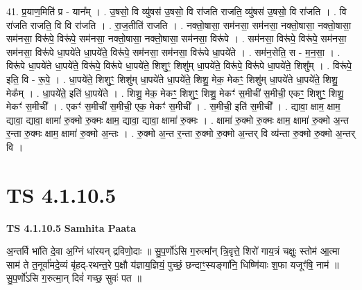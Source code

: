 \documentclass[17pt]{extarticle}
\begin{document}
41. प्र॒याण॒मिति॑ प्र - यान᳚म् । . उ॒षसो॒ वि व्यु॑षस॑ उ॒षसो॒ वि रा॑जति राजति॒ व्यु॑षस॑ उ॒षसो॒ वि रा॑जति । . वि रा॑जति राजति॒ वि वि रा॑जति । . रा॒ज॒तीति॑ राजति । . नक्तो॒षासा॒ सम॑नसा॒ सम॑नसा॒ नक्तो॒षासा॒ नक्तो॒षासा॒ सम॑नसा॒ विरू॑पे॒ विरू॑पे॒ सम॑नसा॒ नक्तो॒षासा॒ नक्तो॒षासा॒ सम॑नसा॒ विरू॑पे । . सम॑नसा॒ विरू॑पे॒ विरू॑पे॒ सम॑नसा॒ सम॑नसा॒ विरू॑पे धा॒पये॑ते धा॒पये॑ते॒ विरू॑पे॒ सम॑नसा॒ सम॑नसा॒ विरू॑पे धा॒पये॑ते । . सम॑न॒सेति॒ स - म॒न॒सा॒ । . विरू॑पे धा॒पये॑ते धा॒पये॑ते॒ विरू॑पे॒ विरू॑पे धा॒पये॑ते॒ शिशुꣳ॒॒ शिशु॑म् धा॒पये॑ते॒ विरू॑पे॒ विरू॑पे धा॒पये॑ते॒ शिशु᳚म् । . विरू॑पे॒ इति॒ वि - रू॒पे॒ । . धा॒पये॑ते॒ शिशुꣳ॒॒ शिशु॑म् धा॒पये॑ते धा॒पये॑ते॒ शिशु॒ मेक॒ मेकꣳ॒॒ शिशु॑म् धा॒पये॑ते धा॒पये॑ते॒ शिशु॒ मेक᳚म् । . धा॒पये॑ते॒ इति॑ धा॒पये॑ते । . शिशु॒ मेक॒ मेकꣳ॒॒ शिशुꣳ॒॒ शिशु॒ मेकꣳ॑ स॒मीची॑ स॒मीची॒ एकꣳ॒॒ शिशुꣳ॒॒ शिशु॒ मेकꣳ॑ स॒मीची᳚ । . एकꣳ॑ स॒मीची॑ स॒मीची॒ एक॒ मेकꣳ॑ स॒मीची᳚ । . स॒मीची॒ इति॑ स॒मीची᳚ । . द्यावा॒ क्षाम॒ क्षाम॒ द्यावा॒ द्यावा॒ क्षामा॑ रु॒क्मो रु॒क्मः क्षाम॒ द्यावा॒ द्यावा॒ क्षामा॑ रु॒क्मः । . क्षामा॑ रु॒क्मो रु॒क्मः क्षाम॒ क्षामा॑ रु॒क्मो अ॒न्त र॒न्ता रु॒क्मः क्षाम॒ क्षामा॑ रु॒क्मो अ॒न्तः । . रु॒क्मो अ॒न्त र॒न्ता रु॒क्मो रु॒क्मो अ॒न्तर् वि व्य॑न्ता रु॒क्मो रु॒क्मो अ॒न्तर् वि । \newline
\pagebreak
{}

\section{ TS 4.1.10.5 }

\textbf{TS 4.1.10.5 } \newline
\textbf{Samhita Paata} \newline

अ॒न्तर्वि भा॑ति दे॒वा अ॒ग्निं धा॑रयन् द्रविणो॒दाः ॥ सु॒प॒र्णो॑ऽसि ग॒रुत्मा᳚न् त्रि॒वृत्ते॒ शिरो॑ गाय॒त्रं चक्षुः॒ स्तोम॑ आ॒त्मा साम॑ ते त॒नूर्वा॑मदे॒व्यं बृ॑हद्-रथन्त॒रे प॒क्षौ य॑ज्ञाय॒ज्ञियं॒ पुच्छं॒ छन्दाꣳ॒॒स्यङ्गा॑नि॒ धिष्णि॑याः श॒फा यजूꣳ॑षि॒ नाम॑ ॥ सु॒प॒र्णो॑ऽसि ग॒रुत्मा॒न् दिवं॑ गच्छ॒ सुवः॑ पत ॥ \newline
\end{document}
